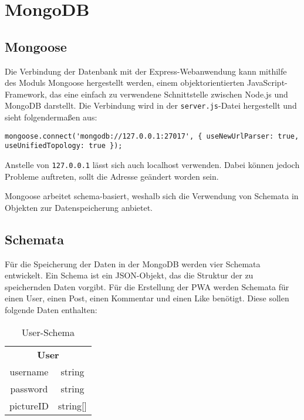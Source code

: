 \chapter{MongoDB}
\section{Mongoose}
Die Verbindung der Datenbank mit der Express-Webanwendung kann mithilfe des Moduls Mongoose hergestellt werden, einem objektorientierten JavaScript-Framework, das eine einfach zu verwendene Schnittstelle zwischen Node.js und MongoDB darstellt. Die Verbindung wird in der \texttt{server.js}-Datei hergestellt und sieht folgendermaßen aus:

\begin{lstlisting}[caption=Herstellen der Verbindung zu MongoDB, label=lst:url]
    mongoose.connect('mongodb://127.0.0.1:27017', { useNewUrlParser: true, useUnifiedTopology: true });
\end{lstlisting}

Anstelle von \texttt{127.0.0.1} lässt sich auch {localhost} verwenden. Dabei können jedoch Probleme auftreten, sollt die Adresse geändert worden sein.

Mongoose arbeitet schema-basiert, weshalb sich die Verwendung von Schemata in Objekten zur Datenspeicherung anbietet.

\section{Schemata}
Für die Speicherung der Daten in der MongoDB werden vier Schemata entwickelt. Ein Schema ist ein JSON-Objekt, das die Struktur der zu speichernden Daten vorgibt. Für die Erstellung der PWA werden Schemata für einen User, einen Post, einen Kommentar und einen Like benötigt. Diese sollen folgende Daten enthalten:

\begin{table}[!htb]
\begin{tabularx}{\textwidth}{|c|c|}
    \cline{1-2}
    \multicolumn{2}{c}{\textbf{User}}\\
    \cline{1-2}
    username & string\\
    \cline{1-2}
    password & string\\
    \cline{1-2}
    pictureID & string[]\\
    \cline{1-2}
\end{tabularx}
\caption{User-Schema}
\label{userschema}
\end{table}


